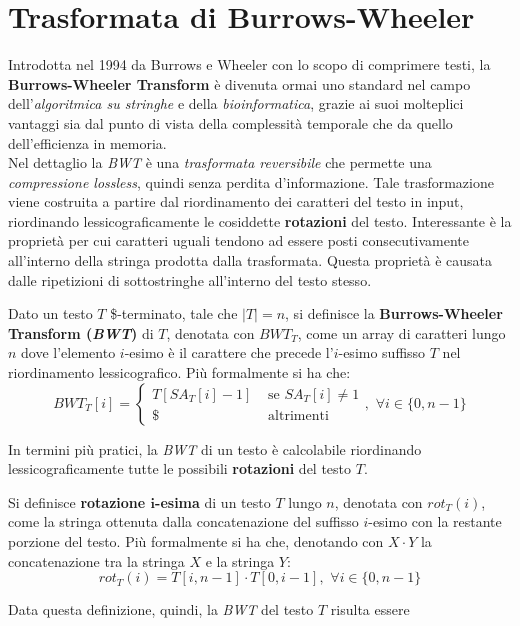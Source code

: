 \section{Trasformata di Burrows-Wheeler}
\label{secbwt}
Introdotta nel 1994 da Burrows e Wheeler con lo scopo di comprimere testi, la
\textbf{Burrows-Wheeler Transform} \cite{bwt} è divenuta ormai uno standard nel
campo dell'\textit{algoritmica su stringhe} e della \textit{bioinformatica},
grazie ai suoi molteplici vantaggi sia dal punto di vista della complessità
temporale che da quello dell'efficienza in memoria.\\
Nel dettaglio la \textit{BWT} è una \textit{trasformata reversibile} che
permette una \textit{compressione lossless}, quindi senza perdita
d'informazione. Tale trasformazione viene costruita a partire dal riordinamento
dei caratteri del testo in input, riordinando lessicograficamente le cosiddette
\textbf{rotazioni} del testo. Interessante è la proprietà per cui caratteri
uguali tendono ad essere posti consecutivamente all'interno della stringa
prodotta dalla trasformata. Questa proprietà è causata dalle ripetizioni di
sottostringhe all'interno del testo stesso.
\begin{definizione}
  Dato un testo $T$ \$-terminato, tale che $|T|=n$, si definisce la
  \textbf{Burrows-Wheeler Transform (\textit{BWT})} di $T$, denotata con
  $BWT_T$, come un array di caratteri lungo $n$ dove l'elemento $i$-esimo è il
  carattere che precede l'$i$-esimo suffisso $T$ nel riordinamento
  lessicografico. Più formalmente si ha che:
  \[BWT_T[i]=
    \begin{cases}
      T[SA_T[i]-1]&\mbox{ se } SA_T[i]\neq 1\\
      \$&\mbox{ altrimenti}
    \end{cases},\,\, \forall i\in\{0,n-1\}
  \]
\end{definizione}
In termini più pratici, la \textit{BWT} di un testo è calcolabile riordinando
lessicograficamente tutte le possibili \textbf{rotazioni} del testo $T$.
\begin{definizione}
  Si definisce \textbf{rotazione $\mathbf{i}$-esima} di
  un testo $T$ lungo $n$, denotata con $rot_T(i)$, come la stringa ottenuta
  dalla concatenazione 
  del suffisso $i$-esimo con la restante porzione del testo. Più formalmente si
  ha che, denotando con $X\cdot Y$ la concatenazione tra
  la stringa $X$ e la stringa $Y$:
  \[rot_T(i)=T[i,n-1]\cdot T[0,i-1],\,\,\forall i\in\{0,n-1\}\]
\end{definizione}
Data questa definizione, quindi, la \textit{BWT} del testo $T$ risulta essere
